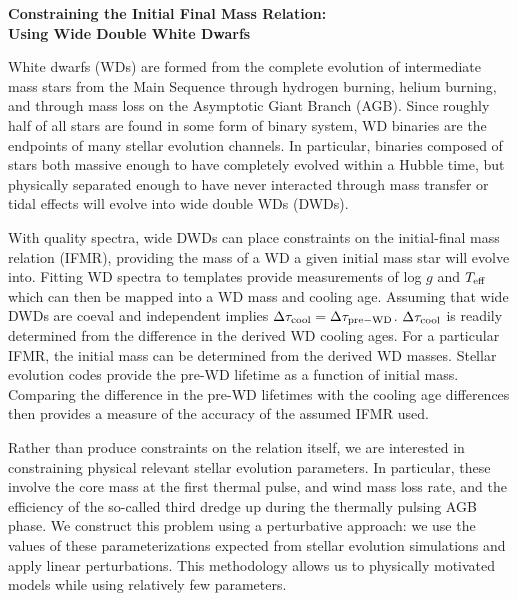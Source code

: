 \documentclass[12pt,preprint]{hackaastex}
\begin{document}
\newcommand{\tauc}{\ifmmode {\tau_{\rm cool}}\else $\tau_{\rm cool}$\fi}
\newcommand{\tauca}{\ifmmode {\tau_{\rm cool,1}}\else $\tau_{\rm cool,1}$\fi}
\newcommand{\taucb}{\ifmmode {\tau_{\rm cool,2}}\else $\tau_{\rm cool,2}$\fi}
\newcommand{\ta}{\ifmmode {\tau_1}\else $\tau_1$\fi}
\newcommand{\tb}{\ifmmode {\tau_2}\else $\tau_2$\fi}
\newcommand{\bs}[1]{\boldsymbol{#1}}
\newcommand{\given}{\,|\,}
\newcommand{\der}{\ifmmode {\rm d}\else d\fi}



\begin{center}
{\large \textbf{\sc Constraining the Initial Final Mass Relation:}}\\
{\large \textbf{\sc Using Wide Double White Dwarfs}}
\end{center}
\normalsize

\vspace{-0.1in}

White dwarfs (WDs) are formed from the complete evolution of intermediate mass stars from the Main Sequence through hydrogen burning, helium burning, and through mass loss on the Asymptotic Giant Branch (AGB). Since roughly half of all stars are found in some form of binary system, WD binaries are the endpoints of many stellar evolution channels. In particular, binaries composed of stars both massive enough to have completely evolved within a Hubble time, but physically separated enough to have never interacted through mass transfer or tidal effects will evolve into wide double WDs (DWDs).

With quality spectra, wide DWDs can place constraints on the initial-final mass relation (IFMR), providing the mass of a WD a given initial mass star will evolve into. Fitting WD spectra to templates provide measurements of log $g$ and $T_{\rm eff}$ which can then be mapped into a WD mass and cooling age. Assuming that wide DWDs are coeval and independent implies $\Delta \tau_{\rm cool} = \Delta \tau_{\rm pre-WD}$. $\Delta \tau_{\rm cool}$ is readily determined from the difference in the derived WD cooling ages. For a particular IFMR, the initial mass can be determined from the derived WD masses. Stellar evolution codes provide the pre-WD lifetime as a function of initial mass.  Comparing the difference in the pre-WD lifetimes with the cooling age differences then provides a measure of the accuracy of the assumed IFMR used. 

Rather than produce constraints on the relation itself, we are interested in constraining physical relevant stellar evolution parameters. In particular, these involve the core mass at the first thermal pulse, and wind mass loss rate, and the efficiency of the so-called third dredge up during the thermally pulsing AGB phase. We construct this problem using a perturbative approach: we use the values of these parameterizations expected from stellar evolution simulations and apply linear perturbations. This methodology allows us to physically motivated models while using relatively few parameters.
\end{document}
